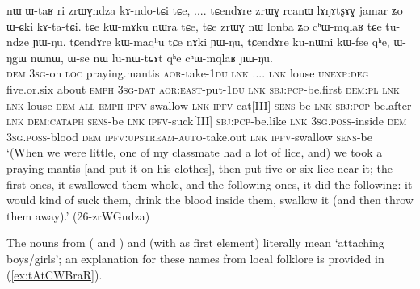 \begin{exe}
\ex \label{ex:zrWGndza}
\gll nɯ ɯ-taʁ ri zrɯɣndza kɤ-ndo-tɕi tɕe, .... tɕendɤre zrɯɣ rcanɯ lɤŋɤtʂɤɣ jamar ʑo ɯ-ɕki kɤ-ta-tɕi. tɕe kɯ-mɤku nɯra tɕe, tɕe zrɯɣ nɯ lonba ʑo cʰɯ-mqlaʁ tɕe tu-ndze ɲɯ-ŋu. tɕendɤre kɯ-maqʰu tɕe nɤki ɲɯ-ŋu, tɕendɤre ku-nɯni kɯ-fse qʰe, ɯ-ŋgɯ nɯnɯ, ɯ-se nɯ lu-nɯ-tɕɤt qʰe cʰɯ-mqlaʁ ɲɯ-ŋu. \\
\textsc{dem} \textsc{3sg}-on \textsc{loc} praying.mantis \textsc{aor}-take-\textsc{1du} \textsc{lnk} .... \textsc{lnk} louse \textsc{unexp}:\textsc{deg} five.or.six about \textsc{emph} \textsc{3sg}-\textsc{dat} \textsc{aor}:\textsc{east}-put-\textsc{1du} \textsc{lnk} \textsc{sbj}:\textsc{pcp}-be.first \textsc{dem}:\textsc{pl} \textsc{lnk} \textsc{lnk} louse \textsc{dem} \textsc{all} \textsc{emph} \textsc{ipfv}-swallow \textsc{lnk} \textsc{ipfv}-eat[III] \textsc{sens}-be \textsc{lnk} \textsc{sbj}:\textsc{pcp}-be.after \textsc{lnk} \textsc{dem}:\textsc{cataph} \textsc{sens}-be \textsc{lnk} \textsc{ipfv}-suck[III] \textsc{sbj}:\textsc{pcp}-be.like \textsc{lnk} \textsc{3sg}.\textsc{poss}-inside \textsc{dem} \textsc{3sg}.\textsc{poss}-blood \textsc{dem} \textsc{ipfv}:\textsc{upstream}-\textsc{auto}-take.out \textsc{lnk} \textsc{ipfv}-swallow \textsc{sens}-be \\
\glt `(When we were little, one of my classmate had a lot of lice, and) we took a praying mantis [and put it on his clothes], then put five or six lice near it; the first ones, it swallowed them whole, and the following ones, it did the following: it would kind of suck them, drink the blood inside them, swallow it (and then throw them away).' (26-zrWGndza)
\end{exe}

The nouns  from ( and ) and  (with  as first element) literally mean `attaching boys/girls'; an explanation for these names from local folklore is provided in (\ref{ex:tAtCWBraR}).

